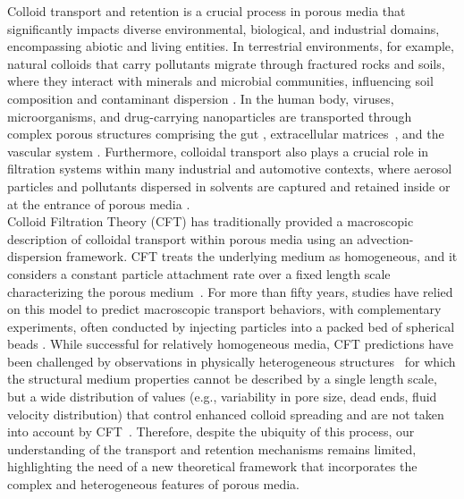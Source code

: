 \documentclass[singlecolumn,pre,notitlepage,preprintnumbers,floatfix,superscriptaddress]{revtex4-1}
\begin{document}
\noindent
Colloid transport and retention is a crucial process in porous media that significantly impacts diverse environmental, biological, and industrial domains, encompassing abiotic and living entities. In terrestrial environments, for example, natural colloids that carry pollutants migrate through fractured rocks and soils, where they interact with minerals and microbial communities, influencing soil composition and contaminant dispersion \cite{bradford_transport_2013,grolimund_1996}. In the human body, viruses, microorganisms, and drug-carrying nanoparticles are transported through complex porous structures comprising the gut \cite{ejazi_mechanisms_2023,scheidweiler_spatial_2024}, extracellular matrices~\cite{malandrino_complex_2018}, and the vascular system \cite{blanco_principles_2015,corliss_methods_2019,jafarnejad_quantification_2019}. Furthermore, colloidal transport also plays a crucial role in filtration systems within many industrial and automotive contexts, where aerosol particles and pollutants dispersed in solvents are captured and retained inside or at the entrance of porous media \cite{tcharkhtchi_overview_2021,bradford2015determining}.\\ 

 \noindent
Colloid Filtration Theory (CFT) has traditionally provided a macroscopic description of colloidal transport within porous media using an advection-dispersion framework. CFT treats the underlying medium as homogeneous, and it considers a constant particle attachment rate over a fixed length scale characterizing the porous medium~\cite{Nelson2007,GinnLang2005}. For more than fifty years, studies have relied on this model to predict macroscopic transport behaviors, with complementary experiments, often conducted by injecting particles into a packed bed of spherical beads \cite{Happel1958}. While successful for relatively homogeneous media, CFT predictions have been challenged by observations in physically heterogeneous structures~\cite{Cortis1,Tuf_Elim2_2004, tufenkji2005breakdown} for which the structural medium properties cannot be described by a single length scale, but a wide distribution of values (e.g., variability in pore size, dead ends, fluid velocity distribution) that control enhanced colloid spreading and are not taken into account by CFT~\cite{redman_pathogen_2001}. Therefore, despite the ubiquity of this process, our understanding of the transport and retention mechanisms remains limited, highlighting the need of a new theoretical framework that incorporates the complex and heterogeneous features of porous media. \\
\end{document}
